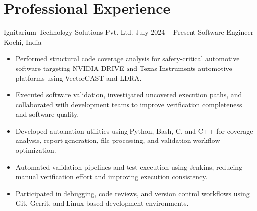 \section{Professional Experience}

\resumeEntry
{Ignitarium Technology Solutions Pvt. Ltd.}
{July 2024 -- Present}
{Software Engineer}
{Kochi, India}

\begin{itemize}
    \item Performed structural code coverage analysis for safety-critical automotive software targeting NVIDIA DRIVE and Texas Instruments automotive platforms using VectorCAST and LDRA.
    
    \item Executed software validation, investigated uncovered execution paths, and collaborated with development teams to improve verification completeness and software quality.
    
    \item Developed automation utilities using Python, Bash, C, and C++ for coverage analysis, report generation, file processing, and validation workflow optimization.
    
    \item Automated validation pipelines and test execution using Jenkins, reducing manual verification effort and improving execution consistency.
    
    \item Participated in debugging, code reviews, and version control workflows using Git, Gerrit, and Linux-based development environments.
\end{itemize}
